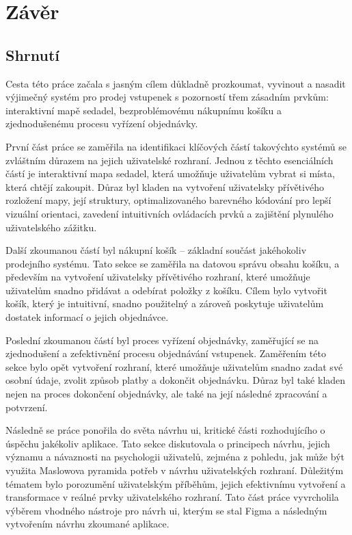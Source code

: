 \chapter*{Závěr}
\label{ch:zaver}

\section*{Shrnutí}
\label{sec:zaver-shrnuti}
Cesta této práce začala s jasným cílem důkladně prozkoumat, vyvinout a nasadit výjimečný systém pro prodej vstupenek s pozorností třem zásadním prvkům: interaktivní mapě sedadel, bezproblémovému nákupnímu košíku a zjednodušenému procesu vyřízení objednávky.

První část práce se zaměřila na identifikaci klíčových částí takovýchto systémů se zvláštním důrazem na jejich uživatelské rozhraní.
Jednou z těchto esenciálních částí je interaktivní mapa sedadel, která umožňuje uživatelům vybrat si místa, která chtějí zakoupit.
Důraz byl kladen na vytvoření uživatelsky přívětivého rozložení mapy, její struktury, optimalizovaného barevného kódování pro lepší vizuální orientaci, zavedení intuitivních ovládacích prvků a zajištění plynulého uživatelského zážitku.

Další zkoumanou částí byl nákupní košík – základní součást jakéhokoliv prodejního systému.
Tato sekce se zaměřila na datovou správu obsahu košíku, a především na vytvoření uživatelsky přívětivého rozhraní, které umožňuje uživatelům snadno přidávat a odebírat položky z košíku.
Cílem bylo vytvořit košík, který je intuitivní, snadno použitelný a zároveň poskytuje uživatelům dostatek informací o jejich objednávce.

Poslední zkoumanou částí byl proces vyřízení objednávky, zaměřující se na zjednodušení a zefektivnění procesu objednávání vstupenek.
Zaměřením této sekce bylo opět vytvoření rozhraní, které umožňuje uživatelům snadno zadat své osobní údaje, zvolit způsob platby a dokončit objednávku.
Důraz byl také kladen nejen na proces dokončení objednávky, ale také na její následné zpracování a potvrzení.

Následně se práce ponořila do světa návrhu \ac{ui}, kritické části rozhodujícího o úspěchu jakékoliv aplikace.
Tato sekce diskutovala o principech návrhu, jejich významu a návaznosti na psychologii uživatelů, zejména z pohledu, jak může být využita Maslowova pyramida potřeb v návrhu uživatelských rozhraní.
Důležitým tématem bylo porozumění uživatelským příběhům, jejich efektivnímu vytvoření a transformace v reálné prvky uživatelského rozhraní.
Tato část práce vyvrcholila výběrem vhodného nástroje pro návrh \ac{ui}, kterým se stal Figma a následným vytvořením návrhu zkoumané aplikace.


